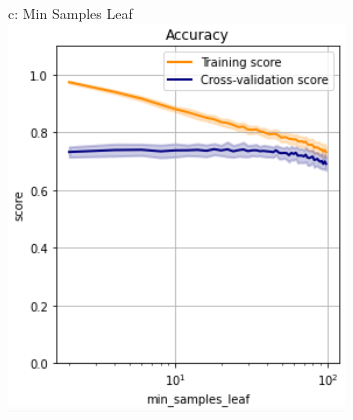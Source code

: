 \documentclass{article}
\begin{document}
\begin{figure}
\begin{subfigure}{.24\textwidth}
	\end{subfigure}
	\begin{subfigure}{.24\textwidth}
		c: Min Samples Leaf
		\centering
		\includegraphics[width=\linewidth]{poland_decision_min_samples_leaf_accuracy.png}
		

\end{subfigure}
\end{figure}
\end{document}
